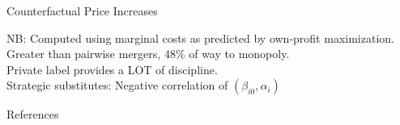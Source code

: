\begin{frame}[plain, label=merger]{Counterfactual Price Increases}
\begin{center}
\scalebox{0.75}{

}
\end{center}
\vspace{1cm}
NB: Computed using marginal costs as predicted by own-profit maximization.\\
Greater than pairwise mergers, 48\% of way to monopoly.\\
Private label provides a LOT of discipline.\\
Strategic substitutes: Negative correlation of $(\beta_{i0}, \alpha_{i})$
\end{frame}

\appendix

\begin{frame}{References}
    
\end{frame}


